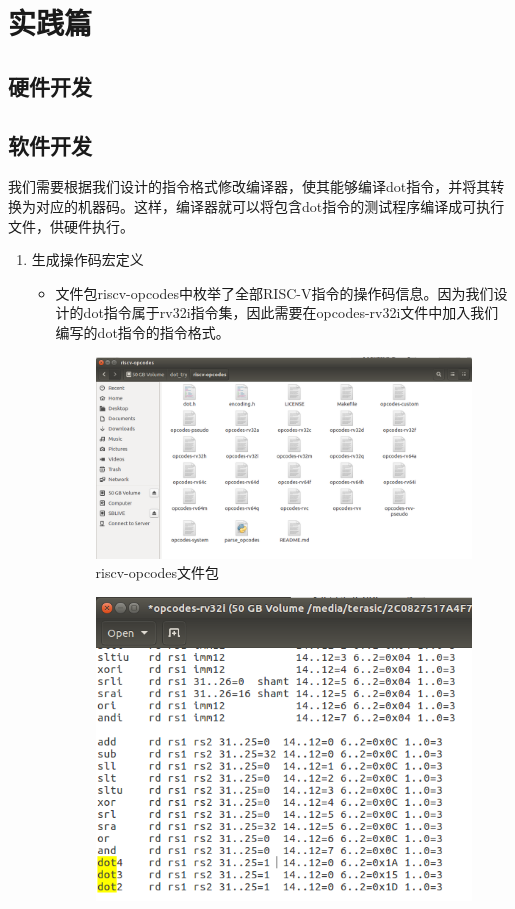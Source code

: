 \documentclass[a4paper, 14pt, oneside]{book} %
\numberwithin{equation}{subsection}
\begin{document}
		\section{实践篇}
		\subsection{硬件开发}
		
		\subsection{软件开发}
		我们需要根据我们设计的指令格式修改编译器，使其能够编译dot指令，并将其转换为对应的机器码。这样，编译器就可以将包含dot指令的测试程序编译成可执行文件，供硬件执行。
		\begin{enumerate}
			\item 生成操作码宏定义
			\begin{itemize}
				\item 文件包riscv-opcodes中枚举了全部RISC-V指令的操作码信息。因为我们设计的dot指令属于rv32i指令集，因此需要在opcodes-rv32i文件中加入我们编写的dot指令的指令格式。
					\begin{figure}[H]
						\centering  
						\includegraphics[scale=0.3]{img/1.png}   
						\caption{riscv-opcodes文件包}
					\end{figure}
					\begin{figure}[H]
						\centering  
						\includegraphics[scale=0.5]{img/2.png}   

\end{figure}
\end{itemize}
\end{enumerate}
\end{document}
